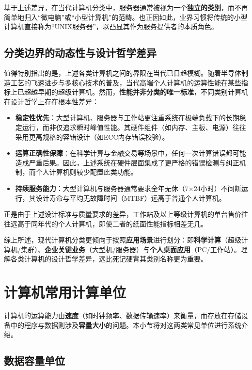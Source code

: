 \documentclass[12pt,UTF8]{ctexbook}
\begin{document}
基于上述差异，在当代计算机分类中，服务器通常被视为一个\textbf{独立的类别}，而不再简单地归入“微电脑”或“小型计算机”的范畴。也正因如此，业界习惯将传统的小型计算机直接称为“UNIX服务器”，以凸显其作为服务提供者的本质角色。

\subsection{分类边界的动态性与设计哲学差异}

值得特别指出的是，上述各类计算机之间的界限在当代已日趋模糊。随着半导体制造工艺的飞速进步与多核心技术的普及，当代高端个人计算机的运算性能在某些指标上已超越早期的超级计算机。然而，\textbf{性能并非分类的唯一标准}，不同类别计算机在设计哲学上存在根本性差异：

\begin{itemize}
\item \textbf{稳定性优先}：大型计算机、服务器与工作站更注重系统在极端负载下的长期稳定运行，而非仅追求瞬时峰值性能。其硬件组件（如内存、主板、电源）往往采用更高规格的容错设计（如ECC内存错误校验）。
\item \textbf{运算正确性保障}：在科学计算与金融交易等场景中，任何一次计算错误都可能造成严重后果。因此，上述系统在硬件层面集成了更严格的错误检测与纠正机制，而个人计算机则较少配置此类功能。
\item \textbf{持续服务能力}：大型计算机与服务器通常要求全年无休（7×24小时）不间断运行，其设计寿命与平均无故障时间（MTBF）远高于普通个人计算机。
\end{itemize}

正是由于上述设计标准与质量要求的差异，工作站及以上等级计算机的单台售价往往远高于同年代的个人计算机，即使二者的纸面性能指标相差无几。

综上所述，现代计算机分类更倾向于按照\textbf{应用场景}进行划分：即\textbf{科学计算}（超级计算机/集群）、\textbf{企业关键业务}（大型机/服务器）与\textbf{个人桌面应用}（PC/工作站）。理解各类计算机的设计哲学差异，远比死记硬背其类别名称更为重要。

\section{计算机常用计算单位}

计算机的运算能力由\textbf{速度}（如时钟频率、数据传输速率）来衡量，而存放在存储设备中的程序与数据则涉及\textbf{容量大小}的问题。本小节将对这两类常见单位进行系统介绍。

\subsection{数据容量单位}
\end{document}
